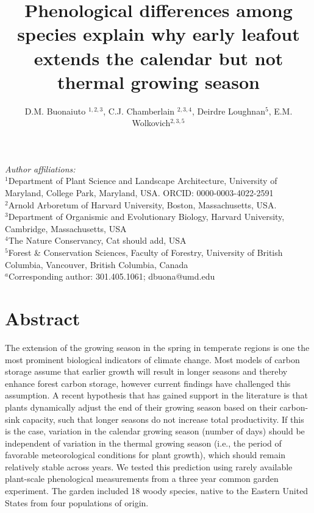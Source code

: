 \documentclass{article}[12pt]
\title{Phenological differences among species explain why early leafout extends the calendar but not thermal growing season}
\author{D.M. Buonaiuto $^{1,2,3}$, C.J. Chamberlain $^{2,3,4}$,
Deirdre Loughnan$^{5}$, E.M. Wolkovich$^{2,3,5}$}
\begin{document}



\maketitle

\noindent \emph{Author affiliations:}\\
\noindent $^1$Department of Plant Science and Landscape Architecture, University of Maryland, College Park, Maryland, USA. ORCID: 0000-0003-4022-2591\\
\noindent $^2$Arnold Arboretum of Harvard University, Boston, Massachusetts, USA.\\
$^3$Department of Organismic and Evolutionary Biology, Harvard University, Cambridge, Massachusetts, USA \\
$^4$The Nature Conservancy, Cat should add, USA \\
$^5$Forest \& Conservation Sciences, Faculty of Forestry, University of British Columbia, Vancouver, British Columbia, Canada\\
$^a$Corresponding author: 301.405.1061; dbuona@umd.edu\\


\setlength{\parindent}{0pt}




\section{Abstract}
The extension of the growing season in the spring in temperate regions is one the most prominent biological indicators of climate change. Most models of carbon storage assume that earlier growth will result in longer seasons and thereby enhance forest carbon storage, however current findings have challenged this assumption.
A recent hypothesis that has gained support in the literature is that plants dynamically adjust the end of their growing season based on their carbon-sink capacity, such that longer seasons do not increase total productivity. If this is the case, variation in the calendar growing season (number of days) should be independent of variation in the thermal growing season (i.e., the period of favorable meteorological conditions for plant growth), which should remain relatively stable across years. %
We tested this prediction using rarely available plant-scale phenological measurements from a three year common garden experiment. The garden included 18 woody species, native to the Eastern United States from four populations of origin. 
\end{document}
